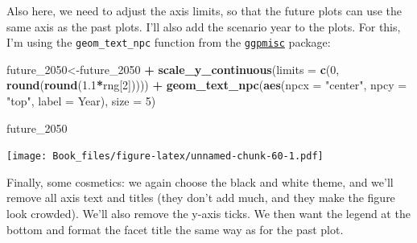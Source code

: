 \documentclass[
]{book}
\newenvironment{Shaded}{\begin{snugshade}}{\end{snugshade}}
\newcommand{\DataTypeTok}[1]{\textcolor[rgb]{0.13,0.29,0.53}{#1}}
\newcommand{\DecValTok}[1]{\textcolor[rgb]{0.00,0.00,0.81}{#1}}
\newcommand{\FloatTok}[1]{\textcolor[rgb]{0.00,0.00,0.81}{#1}}
\newcommand{\KeywordTok}[1]{\textcolor[rgb]{0.13,0.29,0.53}{\textbf{#1}}}
\newcommand{\NormalTok}[1]{#1}
\newcommand{\OperatorTok}[1]{\textcolor[rgb]{0.81,0.36,0.00}{\textbf{#1}}}
\newcommand{\StringTok}[1]{\textcolor[rgb]{0.31,0.60,0.02}{#1}}
\begin{document}
Also here, we need to adjust the axis limits, so that the future plots can use the same axis as the past plots. I'll also add the scenario year to the plots. For this, I'm using the \texttt{geom\_text\_npc} function from the \href{https://cran.r-project.org/web/packages/ggpmisc/ggpmisc.pdf}{\texttt{ggpmisc}} package:

\begin{Shaded}
\begin{Highlighting}[]
\NormalTok{future_}\DecValTok{2050}\NormalTok{<-future_}\DecValTok{2050} \OperatorTok{+}
\StringTok{  }\KeywordTok{scale_y_continuous}\NormalTok{(}\DataTypeTok{limits =} \KeywordTok{c}\NormalTok{(}\DecValTok{0}\NormalTok{, }\KeywordTok{round}\NormalTok{(}\KeywordTok{round}\NormalTok{(}\FloatTok{1.1}\OperatorTok{*}\NormalTok{rng[}\DecValTok{2}\NormalTok{])))) }\OperatorTok{+}
\StringTok{    }\KeywordTok{geom_text_npc}\NormalTok{(}\KeywordTok{aes}\NormalTok{(}\DataTypeTok{npcx =} \StringTok{"center"}\NormalTok{, }\DataTypeTok{npcy =} \StringTok{"top"}\NormalTok{, }\DataTypeTok{label =}\NormalTok{ Year), }\DataTypeTok{size =} \DecValTok{5}\NormalTok{)}

\NormalTok{future_}\DecValTok{2050}
\end{Highlighting}
\end{Shaded}

\texttt{[image: Book\_files/figure-latex/unnamed-chunk-60-1.pdf]}

Finally, some cosmetics: we again choose the black and white theme, and we'll remove all axis text and titles (they don't add much, and they make the figure look crowded). We'll also remove the y-axis ticks. We then want the legend at the bottom and format the facet title the same way as for the past plot.
\end{document}
